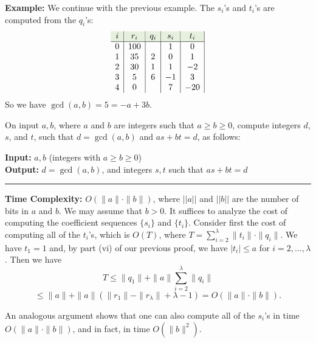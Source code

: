 \noindent
\textbf{Example:} We continue with the previous example. The $s_i$'s and $t_i$'s are computed from the $q_i$'s:
\[
\begin{array}{c|c|c|c|c|c}
\rowcolor{OliveGreen!10}i & r_i & q_i & s_i & t_i \\
\hline
0 & 100 &   & 1 & 0 \\
1 & 35  & 2 & 0 & 1 \\
2 & 30  & 1 & 1 & -2 \\
3 & 5   & 6 & -1 & 3 \\
4 & 0   &  & 7 & -20 \\
\end{array}
\]
So we have $\gcd(a, b) = 5 = -a + 3b$.

\newpage

\begin{Func}

    \label{func:gcdExtended}

    On input $a, b$, where $a$ and $b$ are integers such that $a \geq b \geq 0$, compute integers $d$, $s$, and $t$, such that $d = \gcd(a, b)$ and $as + bt = d$, as follows:

    \vspace{.5em}
    \noindent
    \textbf{Input:} $a, b$ (integers with $a \geq b \geq 0$)\\
    \textbf{Output:} $d = \gcd(a, b)$, and integers $s, t$ such that $as + bt = d$

    \vspace{.5em}
    \begin{algorithm}[H]
        \SetAlgoLined
    \end{algorithm}

    \noindent\rule{\textwidth}{0.4pt}

    \noindent
    \textbf{Time Complexity:} $O(\|a\| \cdot \|b\|)$, where $||a||$ and $||b||$ are the number of bits in $a$ and $b$. We may assume that $b > 0$. It suffices to analyze the cost of computing the coefficient sequences $\{s_i\}$ and $\{t_i\}$.
    Consider first the cost of computing all of the $t_i$'s, which is $O(T)$, where $T = \sum_{i=2}^{\lambda} \|t_i\|\cdot\|q_i\|$. We have $t_1 = 1$ and, by part (vi) of our previous proof, we have $|t_i| \leq a$ for $i = 2, \dots, \lambda$. Then we have
    \[
    T \leq \|q_1\| + \|a\| \sum_{i=2}^{\lambda} \|q_i\|
    \]
    \[
    \leq \|a\| + \|a\|(\|r_1\| - \|r_{\lambda}\| + \lambda - 1) = O(\|a\| \cdot \|b\|).
    \]

    \noindent
    An analogous argument shows that one can also compute all of the $s_i$'s in time $O(\|a\| \cdot \|b\|)$, and in fact, in time $O(\|b\|^2)$.
\end{Func}










